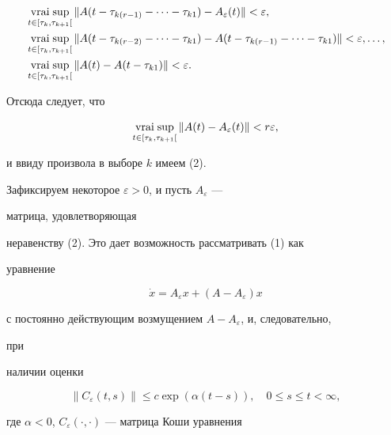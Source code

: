 \begin{pf}
\begin{align*}
&\vraisup_{t\in[\tau_k,\tau_{k+1}[} 


\|A(t-\tau_{k(r-1)}-\dotsb-\tau_{k1})-A_\varepsilon(t)\| 


<\varepsilon, \\ 


%


&\vraisup_{t\in[\tau_k,\tau_{k+1}[}\|A(t-\tau_{k(r-2)}-\dotsb-\tau_{k1}) 


-A(t-\tau_{k(r-1)}-\dotsb-\tau_{k1})\| 


<\varepsilon,\dotsc, \\ 


%


&\vraisup_{t\in[\tau_k,\tau_{k+1}[} 


\|A(t)-A(t-\tau_{k1})\|<\varepsilon. 


\end{align*} 


Отсюда следует, что 


$$ 


\vraisup_{t\in[\tau_k,\tau_{k+1}[}\|A(t)-A_\varepsilon(t)\| 


<r\varepsilon, 


$$ 


и ввиду произвола в выборе $k$ имеем (2). 


\end{pf} 


 


Зафиксируем некоторое $\varepsilon>0$, и пусть $A_\varepsilon$ --- 


матрица, удовлетворяющая 


неравенству (2). Это дает возможность рассматривать (1) как 


уравнение 


$$ 


\Dot x=A_\varepsilon x+(A-A_\varepsilon)x 


$$ 


с постоянно действующим возмущением $A-A_\varepsilon$, и, следовательно, 


при 


наличии оценки 


\begin{equation} 


\|C_\varepsilon(t,s)\|\le c\exp(\alpha(t-s)),\quad 


0\le s\le t<\infty, 


\end{equation} 


где $\alpha<0$, $C_\varepsilon(\cdot,\cdot)$ --- матрица Коши уравнения 


